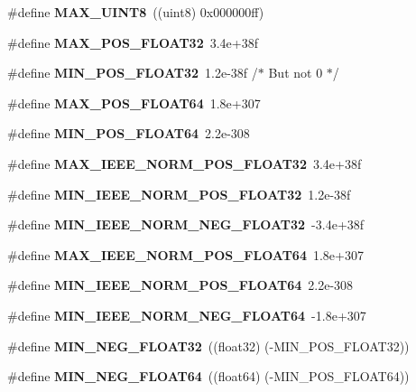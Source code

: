 \begin{DoxyCompactItemize}
\item 
\#define {\bfseries M\+A\+X\+\_\+\+U\+I\+N\+T8}~((uint8)  0x000000ff)\label{prim__type_8h_a05682ca8de174141447ff05a2289a27c}

\item 
\#define {\bfseries M\+A\+X\+\_\+\+P\+O\+S\+\_\+\+F\+L\+O\+A\+T32}~3.\+4e+38f\label{prim__type_8h_a763737bb762908f1014777705e1bd5e0}

\item 
\#define {\bfseries M\+I\+N\+\_\+\+P\+O\+S\+\_\+\+F\+L\+O\+A\+T32}~1.\+2e-\/38f	/$\ast$ But not 0 $\ast$/\label{prim__type_8h_a6ebe6d883694f66620b6d2dd94dc38e8}

\item 
\#define {\bfseries M\+A\+X\+\_\+\+P\+O\+S\+\_\+\+F\+L\+O\+A\+T64}~1.\+8e+307\label{prim__type_8h_a63f40e6ca19e802259413c04cc56bd28}

\item 
\#define {\bfseries M\+I\+N\+\_\+\+P\+O\+S\+\_\+\+F\+L\+O\+A\+T64}~2.\+2e-\/308\label{prim__type_8h_a2fc3595771a7d0f944470fd9ba07cfad}

\item 
\#define {\bfseries M\+A\+X\+\_\+\+I\+E\+E\+E\+\_\+\+N\+O\+R\+M\+\_\+\+P\+O\+S\+\_\+\+F\+L\+O\+A\+T32}~3.\+4e+38f\label{prim__type_8h_ab806e0c70417e38f2302635bbb78c8c5}

\item 
\#define {\bfseries M\+I\+N\+\_\+\+I\+E\+E\+E\+\_\+\+N\+O\+R\+M\+\_\+\+P\+O\+S\+\_\+\+F\+L\+O\+A\+T32}~1.\+2e-\/38f\label{prim__type_8h_a8b4a04ec8b6561c6f831dfd2434fd505}

\item 
\#define {\bfseries M\+I\+N\+\_\+\+I\+E\+E\+E\+\_\+\+N\+O\+R\+M\+\_\+\+N\+E\+G\+\_\+\+F\+L\+O\+A\+T32}~-\/3.\+4e+38f\label{prim__type_8h_a7dcce0312b93eb66d4e662fd035560bf}

\item 
\#define {\bfseries M\+A\+X\+\_\+\+I\+E\+E\+E\+\_\+\+N\+O\+R\+M\+\_\+\+P\+O\+S\+\_\+\+F\+L\+O\+A\+T64}~1.\+8e+307\label{prim__type_8h_a424bb3e6f9a39ec4d9f0ed965ab92026}

\item 
\#define {\bfseries M\+I\+N\+\_\+\+I\+E\+E\+E\+\_\+\+N\+O\+R\+M\+\_\+\+P\+O\+S\+\_\+\+F\+L\+O\+A\+T64}~2.\+2e-\/308\label{prim__type_8h_aa8adb129a54c32e19ba7cc9171779687}

\item 
\#define {\bfseries M\+I\+N\+\_\+\+I\+E\+E\+E\+\_\+\+N\+O\+R\+M\+\_\+\+N\+E\+G\+\_\+\+F\+L\+O\+A\+T64}~-\/1.\+8e+307\label{prim__type_8h_ad8550cd6490d48fd6f4949626084fbdb}

\item 
\#define {\bfseries M\+I\+N\+\_\+\+N\+E\+G\+\_\+\+F\+L\+O\+A\+T32}~((float32) (-\/M\+I\+N\+\_\+\+P\+O\+S\+\_\+\+F\+L\+O\+A\+T32))\label{prim__type_8h_a98d8dffc8bc9036591980531b57e7f19}

\item 
\#define {\bfseries M\+I\+N\+\_\+\+N\+E\+G\+\_\+\+F\+L\+O\+A\+T64}~((float64) (-\/M\+I\+N\+\_\+\+P\+O\+S\+\_\+\+F\+L\+O\+A\+T64))\label{prim__type_8h_a2e65d00cc854972aae6f58d9cb7d383f}

\end{DoxyCompactItemize}
